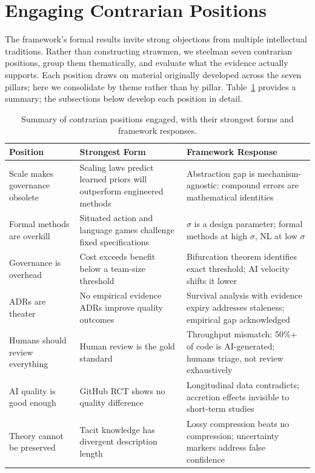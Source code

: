 \section{Engaging Contrarian Positions}
\label{sec:contrarian}

The framework's formal results invite strong objections from multiple intellectual
traditions.  Rather than constructing strawmen, we steelman seven contrarian
positions, group them thematically, and evaluate what the evidence actually
supports.  Each position draws on material originally developed across the
seven pillars; here we consolidate by theme rather than by pillar.  Table~\ref{tab:contrarian-summary} provides a summary; the subsections below
develop each position in detail.

\begin{table}[t]
\centering
\small
\begin{tabular}{lp{4.5cm}p{4.5cm}}
\toprule
\textbf{Position} & \textbf{Strongest Form} & \textbf{Framework Response} \\
\midrule
Scale makes governance obsolete & Scaling laws predict learned priors will outperform engineered methods & Abstraction gap is mechanism-agnostic; compound errors are mathematical identities \\
Formal methods are overkill & Situated action and language games challenge fixed specifications & $\sigma$ is a design parameter; formal methods at high $\sigma$, NL at low $\sigma$ \\
Governance is overhead & Cost exceeds benefit below a team-size threshold & Bifurcation theorem identifies exact threshold; AI velocity shifts it lower \\
ADRs are theater & No empirical evidence ADRs improve quality outcomes & Survival analysis with evidence expiry addresses staleness; empirical gap acknowledged \\
Humans should review everything & Human review is the gold standard & Throughput mismatch: 50\%+ of code is AI-generated; humans triage, not review exhaustively \\
AI quality is good enough & GitHub RCT shows no quality difference & Longitudinal data contradicts; accretion effects invisible to short-term studies \\
Theory cannot be preserved & Tacit knowledge has divergent description length & Lossy compression beats no compression; uncertainty markers address false confidence \\
\bottomrule
\end{tabular}
\caption{Summary of contrarian positions engaged, with their strongest forms and framework responses.}
\label{tab:contrarian-summary}
\end{table}

